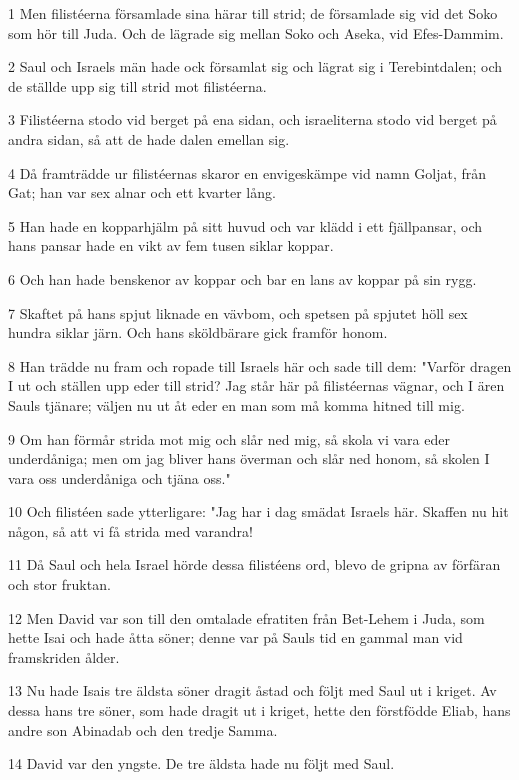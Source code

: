 \par 1 Men filistéerna församlade sina härar till strid; de församlade sig vid det Soko som hör till Juda. Och de lägrade sig mellan Soko och Aseka, vid Efes-Dammim.
\par 2 Saul och Israels män hade ock församlat sig och lägrat sig i Terebintdalen; och de ställde upp sig till strid mot filistéerna.
\par 3 Filistéerna stodo vid berget på ena sidan, och israeliterna stodo vid berget på andra sidan, så att de hade dalen emellan sig.
\par 4 Då framträdde ur filistéernas skaror en envigeskämpe vid namn Goljat, från Gat; han var sex alnar och ett kvarter lång.
\par 5 Han hade en kopparhjälm på sitt huvud och var klädd i ett fjällpansar, och hans pansar hade en vikt av fem tusen siklar koppar.
\par 6 Och han hade benskenor av koppar och bar en lans av koppar på sin rygg.
\par 7 Skaftet på hans spjut liknade en vävbom, och spetsen på spjutet höll sex hundra siklar järn. Och hans sköldbärare gick framför honom.
\par 8 Han trädde nu fram och ropade till Israels här och sade till dem: "Varför dragen I ut och ställen upp eder till strid? Jag står här på filistéernas vägnar, och I ären Sauls tjänare; väljen nu ut åt eder en man som må komma hitned till mig.
\par 9 Om han förmår strida mot mig och slår ned mig, så skola vi vara eder underdåniga; men om jag bliver hans överman och slår ned honom, så skolen I vara oss underdåniga och tjäna oss."
\par 10 Och filistéen sade ytterligare: "Jag har i dag smädat Israels här. Skaffen nu hit någon, så att vi få strida med varandra!
\par 11 Då Saul och hela Israel hörde dessa filistéens ord, blevo de gripna av förfäran och stor fruktan.
\par 12 Men David var son till den omtalade efratiten från Bet-Lehem i Juda, som hette Isai och hade åtta söner; denne var på Sauls tid en gammal man vid framskriden ålder.
\par 13 Nu hade Isais tre äldsta söner dragit åstad och följt med Saul ut i kriget. Av dessa hans tre söner, som hade dragit ut i kriget, hette den förstfödde Eliab, hans andre son Abinadab och den tredje Samma.
\par 14 David var den yngste. De tre äldsta hade nu följt med Saul.
